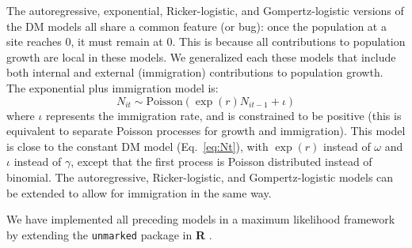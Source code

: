 \documentclass[12pt]{article}
\begin{document}
The autoregressive, exponential, Ricker-logistic, and Gompertz-logistic
versions of the DM models all share a common feature (or bug):
once the population at a site reaches 0, it must remain at 0.
This is because all contributions to population growth are
local in these models.  We generalized each these models that
include both internal and external (immigration) contributions
to population growth.  The exponential plus immigration
model is:
\begin{equation}
  N_{it} \sim \text{Poisson}(\exp(r)N_{it-1} + \iota)
  \label{eq:expimm2}
\end{equation}
where $\iota$ represents the immigration rate, and is
constrained to be
positive (this is equivalent to separate Poisson processes for
growth and immigration).  This model is close to
the constant DM model (Eq.~\ref{eq:Nt}), with $\exp(r)$ instead
of $\omega$ and $\iota$ instead of $\gamma$, except that the first
process is Poisson distributed instead of binomial. The autoregressive, Ricker-logistic,
and Gompertz-logistic models can be extended to allow for immigration in the
same way.

We have implemented all preceding models in
a maximum likelihood framework by extending the
\texttt{unmarked} package
\citep{fiske_chandler:2011} in \textbf{R} \citep{R-2012}.


\end{document}
